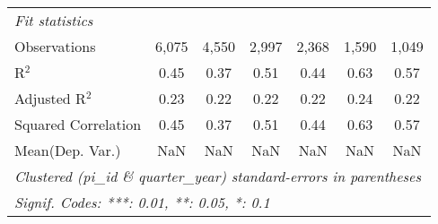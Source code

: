 \begin{tabular}{lcccccc}
   \midrule
   \emph{Fit statistics}\\
   Observations                                               & 6,075           & 4,550          & 2,997    & 2,368    & 1,590          & 1,049\\  
   R$^2$                                                      & 0.45            & 0.37           & 0.51     & 0.44     & 0.63           & 0.57\\  
   Adjusted R$^2$                                             & 0.23            & 0.22           & 0.22     & 0.22     & 0.24           & 0.22\\  
   Squared Correlation                                        & 0.45            & 0.37           & 0.51     & 0.44     & 0.63           & 0.57\\  
Mean(Dep. Var.) & NaN & NaN & NaN & NaN & NaN & NaN \\
   \midrule \midrule
   \multicolumn{7}{l}{\emph{Clustered (pi\_id \& quarter\_year) standard-errors in parentheses}}\\
   \multicolumn{7}{l}{\emph{Signif. Codes: ***: 0.01, **: 0.05, *: 0.1}}\\
\end{tabular}
\par\endgroup
